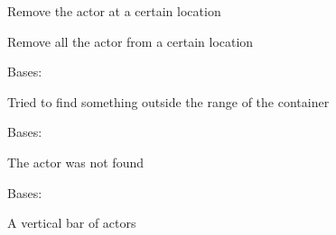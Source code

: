 \documentclass[letterpaper,10pt,english]{sphinxmanual}
\begin{document}
\begin{fulllineitems}
\begin{fulllineitems}
\label{blocks:serge.blocks.layout.MultiGrid.removeActor}
Remove the actor at a certain location

\end{fulllineitems}


\begin{fulllineitems}
\label{blocks:serge.blocks.layout.MultiGrid.removeActors}
Remove all the actor from a certain location

\end{fulllineitems}


\end{fulllineitems}


\begin{fulllineitems}
\label{blocks:serge.blocks.layout.OutOfRange}
Bases: 

Tried to find something outside the range of the container

\end{fulllineitems}


\begin{fulllineitems}
\label{blocks:serge.blocks.layout.UnknownActor}
Bases: 

The actor was not found

\end{fulllineitems}


\begin{fulllineitems}
\label{blocks:serge.blocks.layout.VerticalBar}
Bases: {\hyperref[blocks:serge.blocks.layout.Bar]{}}

A vertical bar of actors

\end{fulllineitems}
\end{document}
